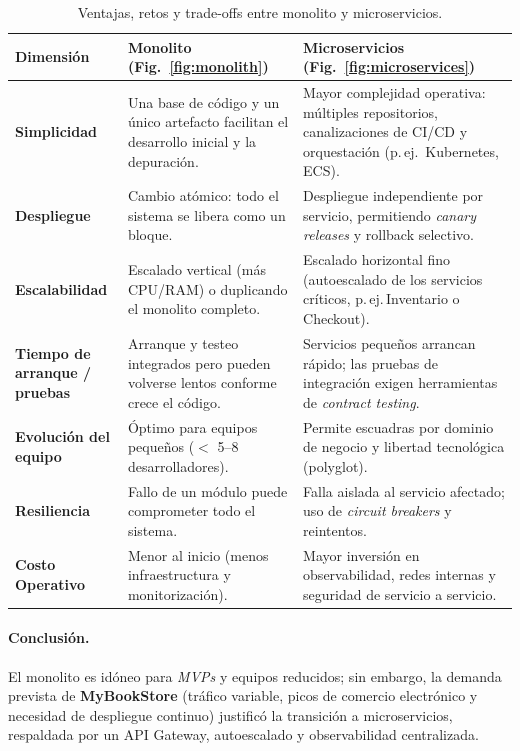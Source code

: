 \begin{table}[H]
\centering
\footnotesize
\begin{tabularx}{\textwidth}{|>{\raggedright\arraybackslash}X|>{\raggedright\arraybackslash}X|>{\raggedright\arraybackslash}X|}
\hline
\textbf{Dimensión} & \textbf{Monolito (Fig.~\ref{fig:monolith})} & \textbf{Microservicios (Fig.~\ref{fig:microservices})} \\ \hline
\textbf{Simplicidad} &
Una base de código y un único artefacto
facilitan el desarrollo inicial y la depuración. &
Mayor complejidad operativa: múltiples
repositorios, canalizaciones de CI/CD y
orquestación (p.\,ej.\, Kubernetes, ECS). \\ \hline
\textbf{Despliegue} &
Cambio atómico: todo el sistema se libera como
un bloque. &
Despliegue independiente por servicio,
permitiendo \emph{canary releases} y rollback
selectivo. \\ \hline
\textbf{Escalabilidad} &
Escalado vertical (más CPU/RAM) o duplicando
el monolito completo. &
Escalado horizontal fino (autoescalado de los
servicios críticos, p.\,ej.\,Inventario o
Checkout). \\ \hline
\textbf{Tiempo de arranque / pruebas} &
Arranque y testeo integrados pero pueden
volverse lentos conforme crece el código. &
Servicios pequeños arrancan rápido; las pruebas
de integración exigen herramientas de
\emph{contract testing}. \\ \hline
\textbf{Evolución del equipo} &
Óptimo para equipos pequeños (\(<\) 5--8
desarrolladores). &
Permite escuadras por dominio de negocio y
libertad tecnológica (polyglot). \\ \hline
\textbf{Resiliencia} &
Fallo de un módulo puede comprometer todo el
sistema. &
Falla aislada al servicio afectado; uso de
\emph{circuit breakers} y reintentos. \\ \hline
\textbf{Costo Operativo} &
Menor al inicio (menos infraestructura y
monitorización). &
Mayor inversión en observabilidad, redes
internas y seguridad de servicio a servicio. \\ \hline
\end{tabularx}
\caption{Ventajas, retos y trade-offs entre monolito y microservicios.}
\label{tab:mono-vs-micro}
\end{table}

\paragraph{Conclusión.}  
El monolito es idóneo para \emph{MVPs} y equipos reducidos; sin embargo,
la demanda prevista de \textbf{MyBookStore} (tráfico variable, picos de
comercio electrónico y necesidad de despliegue continuo) justificó la
transición a microservicios, respaldada por un API Gateway, autoescalado y
observabilidad centralizada.
